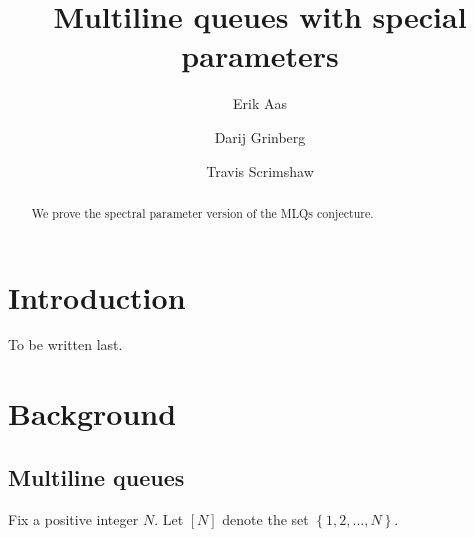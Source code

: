 \documentclass[reqno]{amsart}
\newcommand{\set}[1]{\left\{ #1 \right\}}
\newcommand{\ive}[1]{\left[ #1 \right]}
\theoremstyle{plain}
\theoremstyle{definition}
\numberwithin{equation}{section}
\begin{document}
\title[MLQs]{Multiline queues with special parameters}

\author[E.~Aas]{Erik Aas}
\address[E. Aas]{Department of Mathematics, Pennsylvania State University, ??, ??}

\author[D.~Grinberg]{Darij Grinberg}
\address[D. Grinberg]{School of Mathematics, University of Minnesota, 206 Church St. SE, Minneapolis, MN 55455}

\author[T.~Scrimshaw]{Travis Scrimshaw}



\begin{abstract}
We prove the spectral parameter version of the MLQs conjecture.
\end{abstract}

\maketitle



\section{Introduction}
\label{sec:introduction}

To be written last.






\section{Background}
\label{sec:background}

\subsection{Multiline queues}

Fix a positive integer $N$.
Let $\ive{N}$ denote the set $\set{1, 2, \ldots, N}$.
\end{document}
